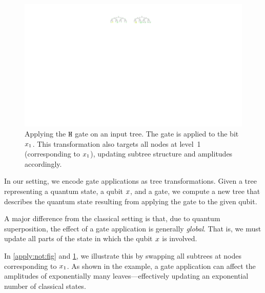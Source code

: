 \begin{figure}[ht] 
    \centering
    \includegraphics[scale=0.9]{Figures/Trees/ApplyH} 
    \caption{Applying the $\mathtt{H}$ gate on an input tree. 
    The gate is applied to the bit $x_1$.
    This transformation also targets all nodes at level~1 (corresponding to $x_1$), updating subtree structure and amplitudes accordingly.}
    \label{apply:H:fig}
\end{figure}

In our setting, we encode gate applications as tree transformations.
Given a tree representing a quantum state, a qubit $x$, and a gate, we compute a new tree that describes the quantum state resulting from applying the gate to the given qubit.

A major difference from the classical setting is that, due to quantum superposition, the effect of a gate application is generally \emph{global}.
That is, we must update all parts of the state in which the qubit $x$ is involved.

In \cref{apply:not:fig} and \cref{apply:H:fig}, we illustrate this by swapping all subtrees at nodes corresponding to $x_1$.
As shown in the example, a gate application can affect the amplitudes of exponentially many leaves—effectively updating an exponential number of classical states.
